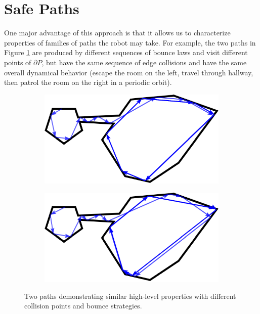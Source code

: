 \documentclass[]{styles/svproc}  %
\begin{document}
\section{Safe Paths} \label{sec:safe}

One major advantage of this approach is that it allows us to characterize
properties of families of paths the robot may take. For example, the  
two paths in Figure \ref{fig:twopaths} are produced by different sequences of
bounce laws and visit different points of $\partial P$, but have the same sequence of edge collisions and have the same overall
dynamical behavior (escape the room on the left, travel through hallway, then
patrol the room on the right in a periodic orbit).

\begin{figure}
\centering
\begin{subfigure}{0.5\textwidth}
\includegraphics[width=\linewidth]{figures/twoc_a}
\end{subfigure}%
\begin{subfigure}{0.5\textwidth}
\includegraphics[width=\linewidth]{figures/twoc_b}
\end{subfigure}
\caption{Two paths demonstrating similar high-level properties with different
collision points and bounce strategies.}
\label{fig:twopaths}
\end{figure}
\end{document}

